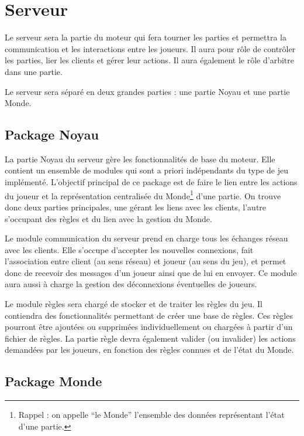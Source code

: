 \documentclass[a4paper,10pt]{report}
\begin{document}
    \section{Serveur}

      Le serveur sera la partie du moteur qui fera tourner les parties et permettra la communication et les interactions entre les joueurs. Il aura pour rôle de contrôler les parties, lier les clients et gérer leur actions. Il aura également le rôle d'arbitre dans une partie. 

      Le serveur sera séparé en deux grandes parties : une partie Noyau et une partie Monde.

      \subsection{Package Noyau}

        La partie Noyau du serveur gère les fonctionnalités de base du moteur. Elle contient un ensemble de modules qui sont a priori indépendants du type de jeu implémenté. L'objectif principal de ce package est de faire le lien entre les actions du joueur et la représentation centralisée du Monde\footnote{Rappel : on appelle ``le Monde'' l'ensemble des données représentant l'état d'une partie.} d'une partie. On trouve donc deux parties principales, une gérant les liens avec les clients, l'autre s'occupant des règles et du lien avec la gestion du Monde. 

        Le module communication du serveur prend en charge tous les échanges réseau avec les clients. Elle s'occupe d'accepter les nouvelles connexions, fait l'association entre client (au sens réseau) et joueur (au sens du jeu), et permet donc de recevoir des messages d'un joueur ainsi que de lui en envoyer. Ce module aura aussi à charge la gestion des déconnexions éventuelles de joueurs. 

        Le module règles sera chargé de stocker et de traiter les règles du jeu. Il contiendra des fonctionnalités permettant de créer une base de règles. Ces règles pourront être ajoutées ou supprimées individuellement ou chargées à partir d'un fichier de règles. La partie règle devra également valider (ou invalider) les actions demandées par les joueurs, en fonction des règles connues et de l'état du Monde.

      \subsection{Package Monde}
\end{document}
